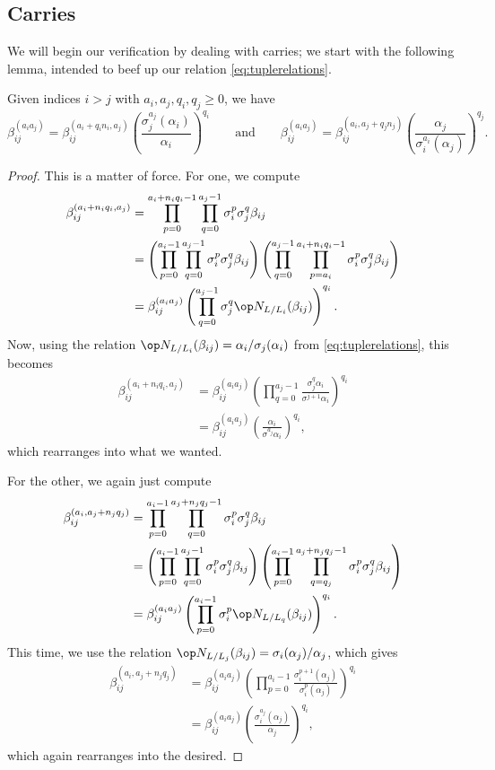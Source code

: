 \subsection{Carries}
We will begin our verification by dealing with carries; we start with the following lemma, intended to beef up our relation \autoref{eq:tuplerelations}.
\begin{lemma}
	Given indices $i>j$ with $a_i,a_j,q_i,q_j\ge0$, we have
	\[\beta_{ij}^{(a_ia_j)}=\beta_{ij}^{(a_i+q_in_i,a_j)}\left(\frac{\sigma_j^{a_j}(\alpha_i)}{\alpha_i}\right)^{q_i}\qquad\text{and}\qquad\beta_{ij}^{(a_ia_j)}=\beta_{ij}^{(a_i,a_j+q_jn_j)}\left(\frac{\alpha_j}{\sigma_i^{a_i}(\alpha_j)}\right)^{q_j}.\]
\end{lemma}
\begin{proof}
	This is a matter of force. For one, we compute
	\begin{align*}
		\beta_{ij}^{(a_i+n_iq_i,a_j)} &= \prod_{p=0}^{a_i+n_iq_i-1}\prod_{q=0}^{a_j-1}\sigma_i^p\sigma_j^q\beta_{ij} \\
		&= \left(\prod_{p=0}^{a_i-1}\prod_{q=0}^{a_j-1}\sigma_i^p\sigma_j^q\beta_{ij}\right)\left(\prod_{q=0}^{a_j-1}\prod_{p=a_i}^{a_i+n_iq_i-1}\sigma_i^p\sigma_j^q\beta_{ij}\right) \\
		&= \beta_{ij}^{(a_ia_j)}\left(\prod_{q=0}^{a_j-1}\sigma_j^q\op N_{L/L_i}(\beta_{ij})\right)^{q_i}.
	\end{align*}
	Now, using the relation $\op N_{L/L_i}(\beta_{ij})=\alpha_i/\sigma_j(\alpha_i)$ from \autoref{eq:tuplerelations}, this becomes
	\begin{align*}
		\beta_{ij}^{(a_i+n_iq_i,a_j)} &= \beta_{ij}^{(a_ia_j)}\left(\prod_{q=0}^{a_j-1}\frac{\sigma_j^q\alpha_i}{\sigma^{j+1}\alpha_i}\right)^{q_i} \\
		&= \beta_{ij}^{(a_ia_j)}\left(\frac{\alpha_i}{\sigma^{a_j}\alpha_i}\right)^{q_i},
	\end{align*}
	which rearranges into what we wanted.

	For the other, we again just compute
	\begin{align*}
		\beta_{ij}^{(a_i,a_j+n_jq_j)} &= \prod_{p=0}^{a_i-1}\prod_{q=0}^{a_j+n_jq_j-1}\sigma_i^p\sigma_j^q\beta_{ij} \\
		&= \left(\prod_{p=0}^{a_i-1}\prod_{q=0}^{a_j-1}\sigma_i^p\sigma_j^q\beta_{ij}\right)\left(\prod_{p=0}^{a_i-1}\prod_{q=q_j}^{a_j+n_jq_j-1}\sigma_i^p\sigma_j^q\beta_{ij}\right) \\
		&= \beta_{ij}^{(a_ia_j)}\left(\prod_{p=0}^{a_i-1}\sigma_i^p\op N_{L/L_q}(\beta_{ij})\right)^{q_i}.
	\end{align*}
	This time, we use the relation $\op N_{L/L_j}(\beta_{ij})=\sigma_i(\alpha_j)/\alpha_j$, which gives
	\begin{align*}
		\beta_{ij}^{(a_i,a_j+n_jq_j)} &= \beta_{ij}^{(a_ia_j)}\left(\prod_{p=0}^{a_i-1}\frac{\sigma_i^{p+1}(\alpha_j)}{\sigma_i^p(\alpha_j)}\right)^{q_i} \\
		&= \beta_{ij}^{(a_ia_j)}\left(\frac{\sigma_i^{a_j}(\alpha_j)}{\alpha_j}\right)^{q_i},
	\end{align*}
	which again rearranges into the desired.
\end{proof}
